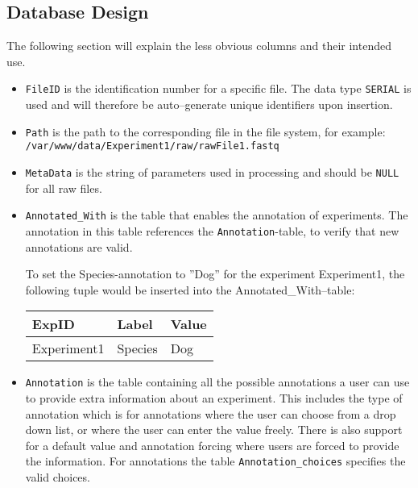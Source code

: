 \subsection{Database Design}
The following section will explain the less obvious columns and their intended use.
\begin{itemize}


\item \texttt{FileID} is the identification number for a specific file. The data type \texttt{SERIAL} is used and will therefore be auto--generate unique identifiers upon insertion.

\item \texttt{Path} is the path to the corresponding file in the file system, for example: \\
\texttt{/var/www/data/Experiment1/raw/rawFile1.fastq}

\item \texttt{MetaData} is the string of parameters used in processing and should be \texttt{NULL} for all raw files.

\item \texttt{Annotated\_With} is the table that enables the annotation of experiments. The annotation in this table references the \texttt{Annotation}-table, to verify that new annotations are valid.

\vspace{0.2cm}
\begin{example}
To set the Species-annotation to ''Dog'' for the experiment Experiment1, the following tuple would be inserted into the Annotated\_With--table:
  \begin{center}
    \begin{tabular}{| l | l | l |}
      \hline
        \cellcolor{blue!25} ExpID & \cellcolor{blue!25} Label & \cellcolor{blue!25} Value \\
      \hline
      Experiment1 & Species & Dog \\
      \hline
      
    \end{tabular}
  \end{center}
\end{example}
\vspace{0.2cm}

\item \texttt{Annotation} is the table containing all the possible annotations a user can use to provide extra information about an experiment. This includes the type of annotation which is  for annotations where the user can choose from a drop down list, or  where the user can enter the value freely. There is also support for a default value and annotation forcing where users are forced to provide the information. For  annotations the table \texttt{Annotation\_choices} specifies the valid choices.


\end{itemize}
